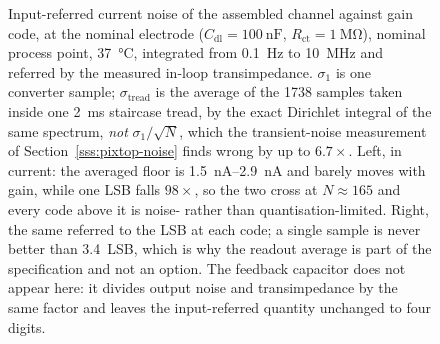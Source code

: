 \begin{figure}[htbp]
  \caption[{Input-referred noise against gain code, in current and in
  converter LSBs.}]{Input-referred current noise of the assembled channel
  against gain code, at the nominal electrode
  (\(C_{\mathrm{dl}} = \SI{100}{\nano\farad}\), \(R_{\mathrm{ct}} =
  \SI{1}{\mega\ohm}\)), nominal process point, \SI{37}{\celsius}, integrated
  from \SI{0.1}{\hertz} to \SI{10}{\mega\hertz} and referred by the measured
  in-loop transimpedance. \(\sigma_1\) is one converter sample; \(\sigma_{\mathrm{tread}}\)
  is the average of the 1738 samples taken inside one \SI{2}{\milli\second}
  staircase tread, by the exact Dirichlet integral of the same spectrum,
  \emph{not} \(\sigma_1/\sqrt{N}\), which the transient-noise measurement of
  Section~\ref{sss:pixtop-noise} finds wrong by up to \(6.7\times\). Left, in
  current: the averaged floor is \SIrange{1.5}{2.9}{\nano\ampere} and barely
  moves with gain, while one LSB falls \(98\times\), so the two cross at
  \(N \approx 165\) and every code above it is noise- rather than
  quantisation-limited. Right, the same referred to the LSB at each code; a
  single sample is never better than \SI{3.4}{LSB}, which is why the readout
  average is part of the specification and not an option. The feedback
  capacitor does not appear here: it divides output noise and transimpedance by
  the same factor and leaves the input-referred quantity unchanged to four
  digits.}
  \label{fig:pixtop-noise}
\end{figure}
